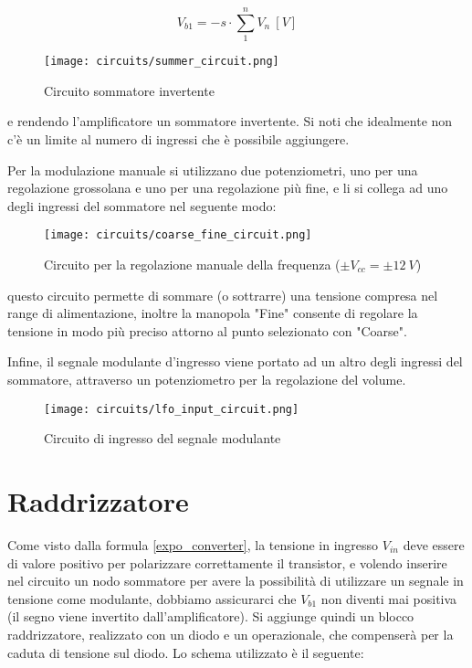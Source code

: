 \begin{equation}
    V_{b1}=-s\cdot\sum_1^n{V_{n}}\ [V]
\end{equation}

\begin{figure}[H]
    \centering
    \texttt{[image: circuits/summer\_circuit.png]}
    \caption{Circuito sommatore invertente}
    \label{summer_circuit}
\end{figure}

e rendendo l'amplificatore un sommatore invertente. Si noti che idealmente non c'è un limite
al numero di ingressi che è possibile aggiungere.

Per la modulazione manuale si utilizzano due potenziometri, uno per una regolazione grossolana
e uno per una regolazione più fine, e li si collega ad uno degli ingressi del sommatore nel
seguente modo:

\begin{figure}[H]
    \centering
    \texttt{[image: circuits/coarse\_fine\_circuit.png]}
    \caption{Circuito per la regolazione manuale della frequenza ($\pm V_{cc}=\pm12\ V$)}
    \label{coarse_fine_circuit}
\end{figure}

questo circuito permette di sommare (o sottrarre) una tensione compresa nel range di
alimentazione, inoltre la manopola "Fine" consente di regolare la tensione in modo più
preciso attorno al punto selezionato con "Coarse".

Infine, il segnale modulante d'ingresso viene portato ad un altro degli ingressi del sommatore,
attraverso un potenziometro per la regolazione del volume.

\begin{figure}[H]
    \centering
    \texttt{[image: circuits/lfo\_input\_circuit.png]}
    \caption{Circuito di ingresso del segnale modulante}
    \label{lfo_input_circuit}
\end{figure}


\section{Raddrizzatore}


Come visto dalla formula \ref{expo_converter}, la tensione in ingresso $V_{in}$ deve essere di
valore positivo per polarizzare correttamente il transistor, e volendo inserire nel circuito
un nodo sommatore per avere la possibilità di utilizzare un segnale in tensione come modulante,
dobbiamo assicurarci che $V_{b1}$ non diventi mai positiva (il segno viene invertito
dall'amplificatore). Si aggiunge quindi un blocco raddrizzatore, realizzato con un diodo e
un operazionale, che compenserà per la caduta di tensione sul diodo. Lo schema utilizzato
è il seguente:

